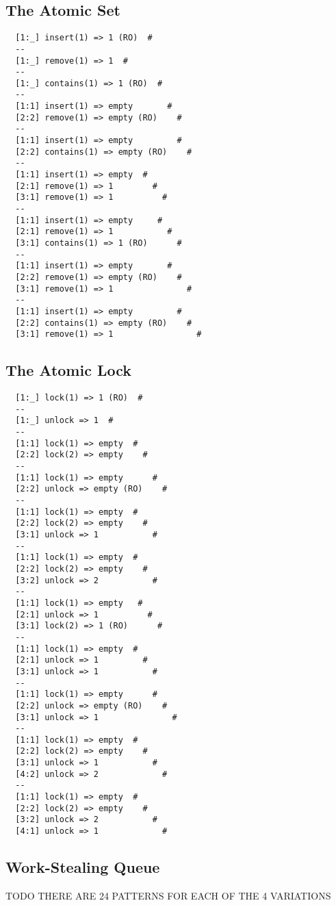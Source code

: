 \subsection{The Atomic Set}

\begin{verbatim}
  [1:_] insert(1) => 1 (RO)  #
  --
  [1:_] remove(1) => 1  #
  --
  [1:_] contains(1) => 1 (RO)  #
  --
  [1:1] insert(1) => empty       #
  [2:2] remove(1) => empty (RO)    #
  --
  [1:1] insert(1) => empty         #
  [2:2] contains(1) => empty (RO)    #
  --
  [1:1] insert(1) => empty  #
  [2:1] remove(1) => 1        #
  [3:1] remove(1) => 1          #
  --
  [1:1] insert(1) => empty     #
  [2:1] remove(1) => 1           #
  [3:1] contains(1) => 1 (RO)      #
  --
  [1:1] insert(1) => empty       #
  [2:2] remove(1) => empty (RO)    #
  [3:1] remove(1) => 1               #
  --
  [1:1] insert(1) => empty         #
  [2:2] contains(1) => empty (RO)    #
  [3:1] remove(1) => 1                 #
\end{verbatim}

\subsection{The Atomic Lock}

\begin{verbatim}
  [1:_] lock(1) => 1 (RO)  #
  --
  [1:_] unlock => 1  #
  --
  [1:1] lock(1) => empty  #
  [2:2] lock(2) => empty    #
  --
  [1:1] lock(1) => empty      #
  [2:2] unlock => empty (RO)    #
  --
  [1:1] lock(1) => empty  #
  [2:2] lock(2) => empty    #
  [3:1] unlock => 1           #
  --
  [1:1] lock(1) => empty  #
  [2:2] lock(2) => empty    #
  [3:2] unlock => 2           #
  --
  [1:1] lock(1) => empty   #
  [2:1] unlock => 1          #
  [3:1] lock(2) => 1 (RO)      #
  --
  [1:1] lock(1) => empty  #
  [2:1] unlock => 1         #
  [3:1] unlock => 1           #
  --
  [1:1] lock(1) => empty      #
  [2:2] unlock => empty (RO)    #
  [3:1] unlock => 1               #
  --
  [1:1] lock(1) => empty  #
  [2:2] lock(2) => empty    #
  [3:1] unlock => 1           #
  [4:2] unlock => 2             #
  --
  [1:1] lock(1) => empty  #
  [2:2] lock(2) => empty    #
  [3:2] unlock => 2           #
  [4:1] unlock => 1             #
\end{verbatim}

\subsection{Work-Stealing Queue}

TODO THERE ARE 24 PATTERNS FOR EACH OF THE 4 VARIATIONS
